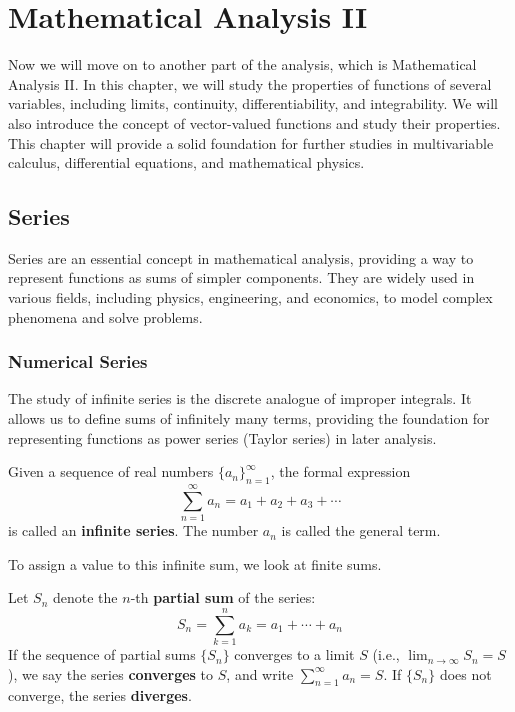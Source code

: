 \chapter{Mathematical Analysis II}

Now we will move on to another part of the analysis, which is Mathematical Analysis II. In this chapter, we will study the properties of functions of several variables, including limits, continuity, differentiability, and integrability. We will also introduce the concept of vector-valued functions and study their properties. This chapter will provide a solid foundation for further studies in multivariable calculus, differential equations, and mathematical physics.

\section{Series}

Series are an essential concept in mathematical analysis, providing a way to represent functions as sums of simpler components. They are widely used in various fields, including physics, engineering, and economics, to model complex phenomena and solve problems.

\subsection{Numerical Series}

The study of infinite series is the discrete analogue of improper integrals. It allows us to define sums of infinitely many terms, providing the foundation for representing functions as power series (Taylor series) in later analysis.

\begin{definition}
Given a sequence of real numbers $\{a_n\}_{n=1}^{\infty}$, the formal expression
\[ \sum_{n=1}^{\infty} a_n = a_1 + a_2 + a_3 + \cdots \]
is called an \textbf{infinite series}. The number $a_n$ is called the general term.
\end{definition}

To assign a value to this infinite sum, we look at finite sums.

\newpage

\begin{definition}[Convergence]
Let $S_n$ denote the $n$-th \textbf{partial sum} of the series:
\[ S_n = \sum_{k=1}^{n} a_k = a_1 + \cdots + a_n \]
If the sequence of partial sums $\{S_n\}$ converges to a limit $S$ (i.e., $\lim_{n \to \infty} S_n = S$), we say the series \textbf{converges} to $S$, and write $\sum_{n=1}^{\infty} a_n = S$.
If $\{S_n\}$ does not converge, the series \textbf{diverges}.
\end{definition}


